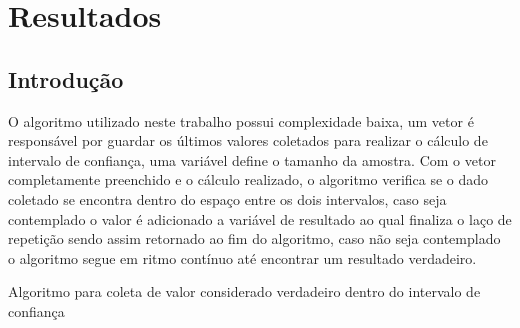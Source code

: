 \chapter{Resultados}\label{cap:resultados}
\section{Introdução}


O algoritmo utilizado neste trabalho possui complexidade baixa, um vetor é responsável por guardar os últimos valores coletados para realizar o cálculo de intervalo de confiança, uma variável define o tamanho da amostra. Com o vetor completamente preenchido e o cálculo realizado, o algoritmo verifica se o dado coletado se encontra dentro do espaço entre os dois intervalos, caso seja contemplado o valor é adicionado a variável de resultado ao qual finaliza o laço de repetição sendo assim retornado ao fim do algoritmo, caso não seja contemplado o algoritmo segue em ritmo contínuo até encontrar um resultado verdadeiro.

\begin{algorithm}[H]
    \caption{Algoritmo para coleta de valor considerado verdadeiro dentro do intervalo de confiança}
    \label{algoritmo:alg1}
\end{algorithm}

